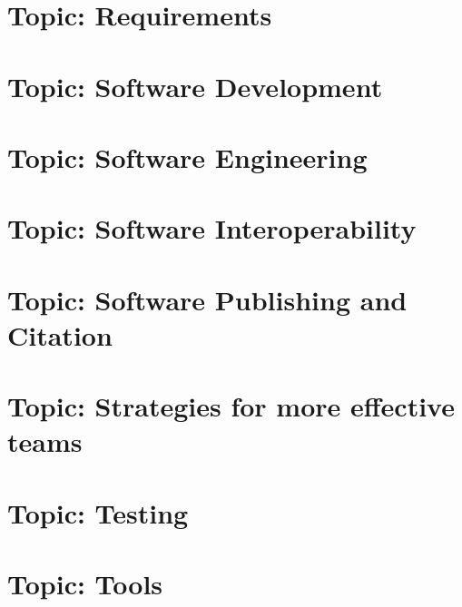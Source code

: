 \documentclass[twoside]{book}
\newcommand{\+}{\discretionary{\mbox{\scriptsize$\hookleftarrow$}}{}{}}
\begin{document}
\chapter{Topic\+: Requirements}
\label{md_markdown_topic_requirements}

\chapter{Topic\+: Software Development}
\label{md_markdown_topic_software_development}

\chapter{Topic\+: Software Engineering}
\label{md_markdown_topic_software_engineering}

\chapter{Topic\+: Software Interoperability}
\label{md_markdown_topic_software_interoperability}

\chapter{Topic\+: Software Publishing and Citation}
\label{md_markdown_topic_software_publishing_and_citation}

\chapter{Topic\+: Strategies for more effective teams}
\label{md_markdown_topic_stategies_for_more_effective_teams}

\chapter{Topic\+: Testing}
\label{md_markdown_topic_testing}

\chapter{Topic\+: Tools}
\label{md_markdown_topic_tools}

\end{document}

